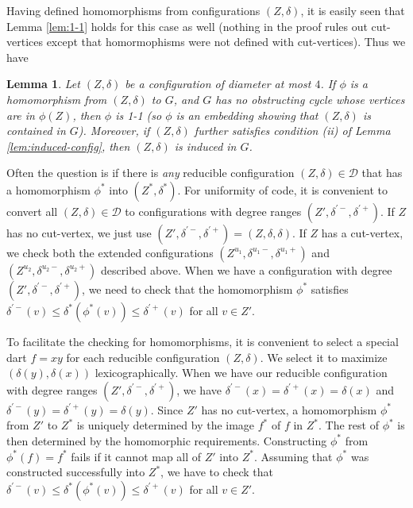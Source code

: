 \documentclass[10pt,a4paper]{article}
\newtheorem{lem}[thm]{Lemma}
\newcommand{\bojan}[1]{\textbf{\textcolor{blue}{~{B: } #1}}}
\def\cD{{\mathcal D}}
\def\showlabel#1{}
\begin{document}
Having defined homomorphisms from configurations $(Z,\delta)$, it is easily seen that Lemma \ref{lem:1-1} holds for this case as well (nothing in the proof rules out cut-vertices except that homormophisms were not defined with cut-vertices). Thus we have
\begin{lem}\label{lem:1-1-cut} \showlabel{lem:1-1-cut}
Let $(Z,\delta)$ be a configuration of diameter at most $4$. If 
$\phi$ is a homomorphism from $(Z,\delta)$ to $G$, and $G$ has no obstructing cycle 
whose vertices are in $\phi(Z)$, then $\phi$ is 1-1 
(so $\phi$ is an embedding showing that $(Z,\delta)$ is contained in $G$).
Moreover, if $(Z,\delta)$ further satisfies condition (ii) of Lemma \ref{lem:induced-config}, then $(Z,\delta)$ is induced in $G$.
\end{lem}
Often the question is if there is \emph{any} reducible configuration $(Z,\delta)\in \cD$
that has a homomorphism $\phi^*$ into $(Z^*,\delta^*)$. For uniformity of code, it is convenient to 
convert all $(Z,\delta)\in\cD$ to configurations with degree ranges $(Z',\delta^{\prime-},\delta^{\prime+})$. If $Z$
has no cut-vertex, we just
use $(Z',\delta^{\prime-},\delta^{\prime+})=
(Z,\delta,\delta)$. If $Z$ has a cut-vertex, we check both the extended configurations $(Z^{u_1},\delta^{u_1-},\delta^{u_1+})$ and $(Z^{u_2},\delta^{u_2-},\delta^{u_2+})$ described above.
When we have a configuration with degree
$(Z',\delta^{\prime-},\delta^{\prime+})$,
we need to check that the homomorphism $\phi^*$ satisfies $\delta^{\prime-}(v)\leq \delta^*(\phi^*(v))\leq \delta^{\prime+}(v)$ for all $v\in Z'$.

To facilitate the checking for homomorphisms, it is convenient to
select a special dart $f=xy$ for each
reducible configuration $(Z,\delta)$. We select it to maximize $(\delta(y), \delta(x))$ lexicographically.
When we have our reducible configuration with degree ranges $(Z',\delta^{\prime-},\delta^{\prime+})$,
we have $\delta^{\prime-}(x)=\delta^{\prime+}(x)=\delta(x)$ and $\delta^{\prime-}(y)=\delta^{\prime+}(y)=\delta(y)$. Since $Z'$ has no cut-vertex, a homomorphism $\phi^*$ from $Z'$ to $Z^*$ is uniquely determined by the image $f^*$ of $f$ in $Z^*$. The rest of $\phi^*$ is then determined by the homomorphic requirements.
Constructing $\phi^*$ from
$\phi^*(f)=f^*$ fails if it cannot map all of $Z'$ into $Z^*$. Assuming that $\phi^*$ was constructed successfully into $Z^*$, we have to check that $\delta^{\prime-}(v)\leq \delta^*(\phi^*(v))\leq \delta^{\prime+}(v)$ for all $v\in Z'$.
\end{document}
